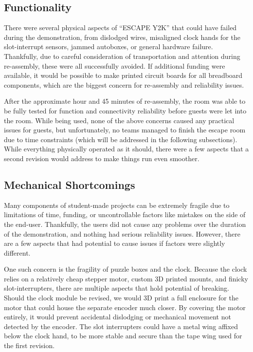 \documentclass[conference]{IEEEtran}
\begin{document}
\subsection{Functionality}
There were several physical aspects of ``ESCAPE Y2K'' that could have failed during the demonstration, from dislodged wires, 
misaligned clock hands for the slot-interrupt sensors, jammed autoboxes, or general hardware failure. Thankfully, due 
to careful consideration of transportation and attention during re-assembly, these were all successfully avoided. If 
additional funding were available, it would be possible to make printed circuit boards for all breadboard components, 
which are the biggest concern for re-assembly and reliability issues.

\indent After the approximate hour and 45 minutes of re-assembly, the room was able to be fully tested for function 
and connectivity reliability before guests were let into the room. While being used, none of the above concerns caused 
any practical issues for guests, but unfortunately, no teams managed to finish the escape room due to time constraints 
(which will be addressed in the following subsections). While everything physically operated as it should, there were a 
few aspects that a second revision would address to make things run even smoother.

\subsection{Mechanical Shortcomings}
Many components of student-made projects can be extremely fragile due to limitations of time, funding, or uncontrollable 
factors like mistakes on the side of the end-user. Thankfully, the users did not cause any problems over the duration of 
the demonstration, and nothing had serious reliability issues. However, there are a few aspects that had potential to cause 
issues if factors were slightly different.

\indent One such concern is the fragility of puzzle boxes and the clock. Because the clock relies on a relatively cheap 
stepper motor, custom 3D printed mounts, and finicky slot-interrupters, there are multiple aspects that hold potential 
of breaking. Should the clock module be revised, we would 3D print a full enclosure for the motor that could house the 
separate encoder much closer. By covering the motor entirely, it would prevent accidental dislodging or mechanical 
movement not detected by the encoder. The slot interrupters could have a metal wing affixed below the clock hand, to be 
more stable and secure than the tape wing used for the first revision. 
\end{document}
